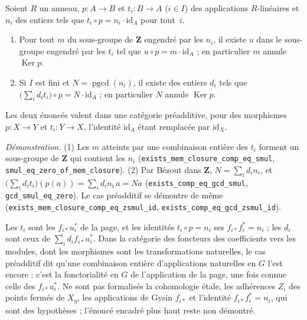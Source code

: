 \begin{encadre}
\begin{enonce}
Soient $R$ un anneau, $p : A \to B$ et $t_i : B \to A$ ($i \in I$) des applications $R$-linéaires et $n_i$ des entiers tels que $t_i \circ p = n_i \cdot \mathrm{id}_A$ pour tout~$i$.
\begin{enumerate}
\item Pour tout $m$ du sous-groupe de $\mathbf Z$ engendré par les $n_i$, il existe $u$ dans le sous-groupe engendré par les $t_i$ tel que $u \circ p = m \cdot \mathrm{id}_A$ ; en particulier $m$ annule $\operatorname{Ker} p$.
\item Si $I$ est fini et $N = \operatorname{pgcd}(n_i)$, il existe des entiers $d_i$ tels que $\bigl(\sum_i d_i t_i\bigr) \circ p = N \cdot \mathrm{id}_A$ ; en particulier $N$ annule $\operatorname{Ker} p$.
\end{enumerate}
Les deux énoncés valent dans une catégorie préadditive, pour des morphismes $p : X \to Y$ et $t_i : Y \to X$, l'identité $\mathrm{id}_A$ étant remplacée par $\mathrm{id}_X$.
\end{enonce}
\end{encadre}
{\small \emph{Démonstration.} (1) Les $m$ atteints par une combinaison entière des $t_i$ forment un sous-groupe de $\mathbf Z$ qui contient les $n_i$ (\texttt{exists\_mem\_closure\_comp\_eq\_smul}, \texttt{smul\_eq\_zero\_of\_mem\_closure}). (2) Par Bézout dans $\mathbf Z$, $N = \sum_i d_i n_i$, et $\bigl(\sum_i d_i t_i\bigr)(p(a)) = \sum_i d_i n_i\, a = N a$ (\texttt{exists\_comp\_eq\_gcd\_smul}, \texttt{gcd\_smul\_eq\_zero}). Le cas préadditif se démontre de même (\texttt{exists\_mem\_closure\_comp\_eq\_zsmul\_id}, \texttt{exists\_comp\_eq\_gcd\_zsmul\_id}).

Les $t_i$ sont les $f_{i*}u_i^*$ de la page, et les identités $t_i \circ p = n_i$ ses $f_{i*}f_i^* = n_i$ ; les $d_i$ sont ceux de $\sum_i d_i f_{i*}u_i^*$. Dans la catégorie des foncteurs des coefficients vers les modules, dont les morphismes sont les transformations naturelles, le cas préadditif dit qu'une combinaison entière d'applications naturelles en $G$ l'est encore : c'est la fonctorialité en $G$ de l'application de la page, une fois connue celle des $f_{i*}u_i^*$. Ne sont pas formalisés la cohomologie étale, les adhérences $Z_i$ des points fermés de $X_\eta$, les applications de Gysin $f_{i*}$ et l'identité $f_{i*}f_i^* = n_i$, qui sont des hypothèses ; l'énoncé encadré plus haut reste non démontré.\par}

